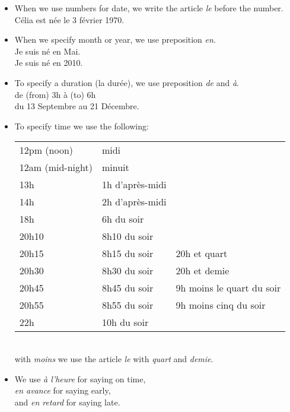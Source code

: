 \begin{itemize}
\item When we use numbers for date, we write the article \emph{le} before the number.\\
C\'elia est n\'ee le 3 f\'evrier 1970.
\item When we specify month or year, we use preposition \emph{en}.\\
Je suis n\'e en Mai.\\
Je suis n\'e en 2010.
\item To specify a duration (la dur\'ee), we use preposition \emph{de} and \emph{\`a}.\\
de (from) 3h \`a (to) 6h\\
du 13 Septembre au 21 D\'ecembre.
\item To specify time we use the following:\\
\begin{tabular}{l l l}
12pm (noon) & midi\\
12am (mid-night) & minuit\\
13h & 1h d'apr\`es-midi\\
14h & 2h d'apr\`es-midi\\
18h & 6h du soir  \\
20h10 & 8h10 du soir\\
20h15 & 8h15 du soir & 20h et quart \\
20h30 & 8h30 du soir & 20h et demie \\
20h45 & 8h45 du soir & 9h moins le quart du soir \\
20h55 & 8h55 du soir & 9h moins cinq du soir \\
22h & 10h du soir \\
\end{tabular}\\
with \emph{moins} we use the article \emph{le} with \emph{quart} and \emph{demie}.
\item We use \emph{\`a l'heure} for saying on time,\\
\emph{en avance} for saying early,\\
and \emph{en retard} for saying late.
\end{itemize}
